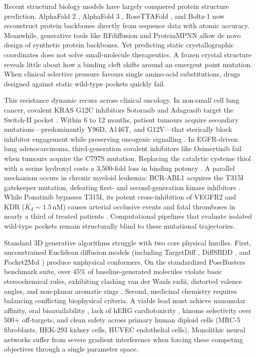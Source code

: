 \documentclass[11pt,a4paper]{article}
\begin{document}
Recent structural biology models have largely conquered protein structure prediction. AlphaFold 2 \cite{jumper2021highly}, AlphaFold 3 \cite{abramson2024accurate}, RoseTTAFold \cite{baek2021accurate,krishna2024rosettafold}, and Boltz-1 \cite{wohlwend2024boltz1} now reconstruct protein backbones directly from sequence data with atomic accuracy. Meanwhile, generative tools like RFdiffusion \cite{watson2023rfdiffusion} and ProteinMPNN \cite{dauparas2022proteinmpnn} allow de novo design of synthetic protein backbones. Yet predicting static crystallographic coordinates does not solve small-molecule therapeutics. A frozen crystal structure reveals little about how a binding cleft shifts around an emergent point mutation. When clinical selective pressure favours single amino-acid substitutions, drugs designed against static wild-type pockets quickly fail.

This resistance dynamic recurs across clinical oncology. In non-small cell lung cancer, covalent KRAS G12C inhibitors Sotorasib \cite{canon2019clinical} and Adagrasib \cite{hallin2020kras} target the Switch-II pocket \cite{ostrem2013kras}. Within 6 to 12 months, patient tumours acquire secondary mutations—predominantly Y96D, A146T, and G12V—that sterically block inhibitor engagement while preserving oncogenic signalling \cite{tanaka2021clinical,awad2021acquired}. In EGFR-driven lung adenocarcinoma, third-generation covalent inhibitors like Osimertinib \cite{janne2015azn9291} fail when tumours acquire the C797S mutation. Replacing the catalytic cysteine thiol with a serine hydroxyl costs a 3,500-fold loss in binding potency \cite{thress2015acquired,niederst2015mechanisms}. A parallel mechanism occurs in chronic myeloid leukemia: BCR-ABL1 acquires the T315I gatekeeper mutation, defeating first- and second-generation kinase inhibitors \cite{shah2004overriding}. While Ponatinib bypasses T315I, its potent cross-inhibition of VEGFR2 and KDR ($K_d \sim 1.5$\,nM) causes arterial occlusive events and fatal thromboses in nearly a third of treated patients \cite{cortes2013safety,moslehi2015revisiting}. Computational pipelines that evaluate isolated wild-type pockets remain structurally blind to these mutational trajectories.

Standard 3D generative algorithms struggle with two core physical hurdles. First, unconstrained Euclidean diffusion models (including TargetDiff \cite{guan2023targetdiff}, DiffSBDD \cite{schneuing2022diffsbdd}, and Pocket2Mol \cite{peng2022pocket2mol}) produce unphysical conformers. On the standardized PoseBusters benchmark suite, over 45\% of baseline-generated molecules violate basic stereochemical rules, exhibiting clashing van der Waals radii, distorted valence angles, and non-planar aromatic rings \cite{van2023posebusters}. Second, medicinal chemistry requires balancing conflicting biophysical criteria. A viable lead must achieve nanomolar affinity, oral bioavailability \cite{lipinski2001experimental}, lack of hERG cardiotoxicity \cite{sanguinetti2006herg}, kinome selectivity over 500+ off-targets, and clean safety across primary human diploid cells (MRC-5 fibroblasts, HEK-293 kidney cells, HUVEC endothelial cells). Monolithic neural networks suffer from severe gradient interference when forcing these competing objectives through a single parameter space.
\end{document}
